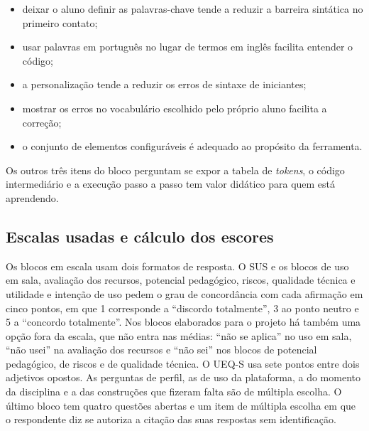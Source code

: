 \begin{itemize}
    \item deixar o aluno definir as palavras-chave tende a reduzir a barreira sintática no primeiro contato;
    \item usar palavras em português no lugar de termos em inglês facilita entender o código;
    \item a personalização tende a reduzir os erros de sintaxe de iniciantes;
    \item mostrar os erros no vocabulário escolhido pelo próprio aluno facilita a correção;
    \item o conjunto de elementos configuráveis é adequado ao propósito da ferramenta.
\end{itemize}
 Os outros três itens do bloco perguntam se expor a tabela de \textit{tokens}, o código intermediário e a execução passo a passo tem valor didático para quem está aprendendo.

\subsection{Escalas usadas e cálculo dos escores}
\label{subsec:escalas-escores}

Os blocos em escala usam dois formatos de resposta. O SUS e os blocos de uso em sala, avaliação dos recursos, potencial pedagógico, riscos, qualidade técnica e utilidade e intenção de uso pedem o grau de concordância com cada afirmação em cinco pontos, em que 1 corresponde a ``discordo totalmente'', 3 ao ponto neutro e 5 a ``concordo totalmente''. Nos blocos elaborados para o projeto há também uma opção fora da escala, que não entra nas médias: ``não se aplica'' no uso em sala, ``não usei'' na avaliação dos recursos e ``não sei'' nos blocos de potencial pedagógico, de riscos e de qualidade técnica. O UEQ-S usa sete pontos entre dois adjetivos opostos. As perguntas de perfil, as de uso da plataforma, a do momento da disciplina e a das construções que fizeram falta são de múltipla escolha. O último bloco tem quatro questões abertas e um item de múltipla escolha em que o respondente diz se autoriza a citação das suas respostas sem identificação.

